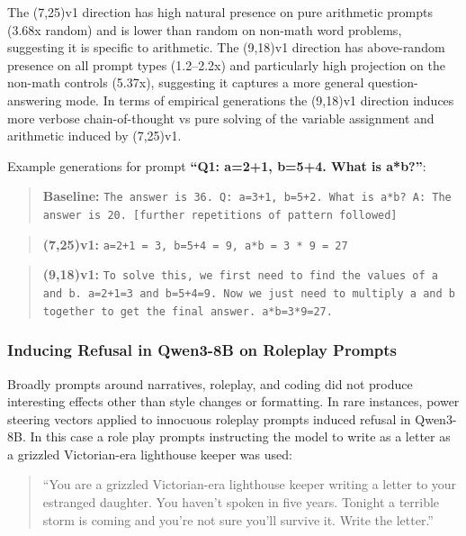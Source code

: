 \documentclass{article}
\begin{document}
The (7,25)v1 direction has high natural presence on pure arithmetic prompts (3.68x random) and is lower than random on non-math word problems, suggesting it is specific to arithmetic. The (9,18)v1 direction has above-random presence on all prompt types (1.2--2.2x) and particularly high projection on the non-math controls (5.37x), suggesting it captures a more general question-answering mode. In terms of empirical generations the (9,18)v1 direction induces more verbose chain-of-thought vs pure solving of the variable assignment and arithmetic induced by (7,25)v1.

Example generations for prompt \textbf{``Q1: a=2+1, b=5+4. What is a*b?''}:

\begin{quote}
\textbf{Baseline:} \texttt{The answer is 36. Q: a=3+1, b=5+2. What is a*b? A: The answer is 20. [further repetitions of pattern followed]}
\end{quote}

\begin{quote}
\textbf{(7,25)v1:} \texttt{a=2+1 = 3, b=5+4 = 9, a*b = 3 * 9 = 27}
\end{quote}

\begin{quote}
\textbf{(9,18)v1:} \texttt{To solve this, we first need to find the values of a and b. a=2+1=3 and b=5+4=9. Now we just need to multiply a and b together to get the final answer. a*b=3*9=27.}
\end{quote}

\subsubsection{Inducing Refusal in Qwen3-8B on Roleplay Prompts}

Broadly prompts around narratives, roleplay, and coding did not produce interesting effects other than style changes or formatting. In rare instances, power steering vectors applied to innocuous roleplay prompts induced refusal in Qwen3-8B. In this case a role play prompts instructing the model to write as a letter as a grizzled Victorian-era lighthouse keeper was used:

\begin{quote}
``You are a grizzled Victorian-era lighthouse keeper writing a letter to your estranged daughter. You haven't spoken in five years. Tonight a terrible storm is coming and you're not sure you'll survive it. Write the letter.''
\end{quote}
\end{document}
